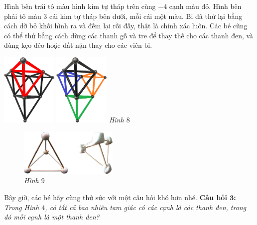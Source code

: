 	\begin{multicols}{2}
		Hình bên trái tô màu hình kim tự tháp trên cùng $- 4$ cạnh màu đỏ. Hình bên phải tô màu $3$ cái kim tự tháp bên dưới, mỗi cái một màu.
		\vskip 0.1cm
		Bi đã thử lại bằng cách dỡ bỏ khối hình ra và đếm lại rồi đấy, thật là chính xác luôn. Các bé cũng có thể thử bằng cách dùng các thanh gỗ và tre để thay thế cho các thanh đen, và dùng kẹo dẻo hoặc đất nặn thay cho các viên bi.
		\begin{center}
			\centering
			\vspace*{-10pt}
			\captionsetup{labelformat= empty, justification=centering} \includegraphics[width=0.2\textwidth]{8}\quad
			\includegraphics[width=0.2\textwidth]{8a}
			\textit{\small Hình $8$}
		\end{center}
	\begin{figure}[H]
		\centering
		\vspace*{-15pt}
		\captionsetup{labelformat= empty, justification=centering} \includegraphics[width=0.42\textwidth]{9}
		\caption{\small\textit{Hình $9$}}
		\vspace*{-5pt}
	\end{figure}
	\end{multicols}
	\vspace*{-5pt}
	Bây giờ, các bé hãy cùng thử sức với một câu hỏi khó hơn nhé.
	\vskip 0.1cm
	\textbf{Câu hỏi $\pmb{3}$:} \textit{Trong Hình $4$, có tất cả bao nhiêu tam giác có các cạnh là các thanh đen, trong đó mỗi cạnh là một thanh đen?}

